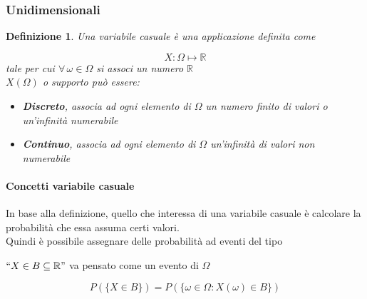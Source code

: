 \documentclass{article}
\newtheorem{definition}{Definizione}[section]
\begin{document}
              \subsubsection{Unidimensionali}
                
                \begin{definition}{}
                Una variabile casuale è una applicazione definita come
                
                $$  
                    X\colon \Omega \mapsto \mathbb{R} 
                $$
                tale per cui  $\forall \, \omega \in \Omega$ si associ un numero $\mathbb{R}$\\
                
                $X(\Omega)$ o supporto può essere:%
                 \begin{itemize}
                    \item \textbf{Discreto}, associa ad ogni elemento di $ \Omega$ un numero finito di valori o un'infinità numerabile
                    \item \textbf{Continuo}, associa ad ogni elemento di $ \Omega$ un'infinità di valori non numerabile
                \end{itemize}
            
                \end{definition}
                
                \paragraph{Concetti variabile casuale}
                 In base alla definizione, quello che interessa di una variabile casuale è calcolare la probabilità che essa assuma certi valori.\\
                 Quindi è possibile assegnare delle probabilità ad eventi del tipo\bigbreak
                 
                 $  ``X\in B \subseteq \mathbb{R}"  $ va pensato come un evento di $\Omega$
                 
                 $$    
                     P(\{ X\in B\}) =P(\{ \omega \in \Omega : X(\omega) \in B\})
                 $$
                 
                 \bigbreak
                
\end{document}
